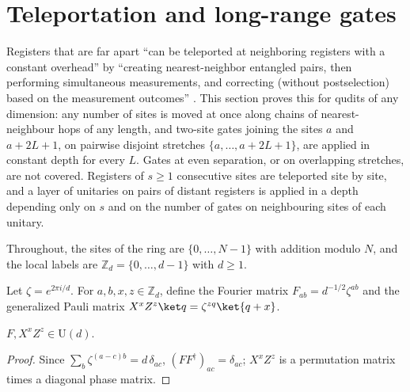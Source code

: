 
\section{Teleportation and long-range gates}
\label{sec:qc_teleportation}

Registers that are far apart ``can be teleported at neighboring registers with
a constant overhead'' by ``creating nearest-neighbor entangled pairs, then
performing simultaneous measurements, and correcting (without postselection)
based on the measurement outcomes'' \cite{Malz2024Preparation}. This section
proves this for qudits of any dimension: any number of sites is moved at once
along chains of nearest-neighbour hops of any length, and two-site gates
joining the sites $a$ and $a+2L+1$, on pairwise disjoint stretches
$\{a,\dots,a+2L+1\}$, are applied in constant depth for every $L$. Gates at
even separation, or on overlapping stretches, are not covered. Registers of
$s\ge1$ consecutive sites are teleported site by site, and a layer of
unitaries on pairs of distant registers is applied in a depth depending only
on $s$ and on the number of gates on neighbouring sites of each unitary.

Throughout, the sites of the ring are $\{0,\dots,N-1\}$ with addition modulo
$N$, and the local labels are $\mathbb Z_d=\{0,\dots,d-1\}$ with $d\ge1$.

\begin{definition}
    \label{def:qc_qudit_pauli}
    \leanok
    Let $\zeta=e^{2\pi i/d}$. For $a,b,x,z\in\mathbb Z_d$, define the Fourier matrix $F_{ab}=d^{-1/2}\zeta^{ab}$ and the generalized Pauli matrix $X^xZ^z\ket q=\zeta^{zq}\ket{q+x}$.
\end{definition}

\begin{lemma}
    \label{lem:qc_qudit_pauli_unitary}
    \leanok
    $F,X^xZ^z\in\mathrm U(d)$.
\end{lemma}
\begin{proof}
    \leanok
    Since $\sum_b\zeta^{(a-c)b}=d\,\delta_{ac}$, $(FF^\dagger)_{ac}=\delta_{ac}$; $X^xZ^z$ is a permutation matrix times a diagonal phase matrix.
\end{proof}

